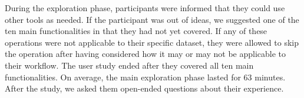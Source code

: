 \par During the exploration phase, participants were informed that they could use other tools as needed. If the participant was out of ideas, we suggested one of the ten main functionalities in \zv {}that they had not yet covered. If any of these operations were not applicable to their specific dataset, they were allowed to skip the operation after having considered how it may or may not be applicable to their workflow. The user study ended after they covered all ten main functionalities. On average, the main exploration phase lasted for 63 minutes. After the study, we asked them open-ended questions about their experience.
